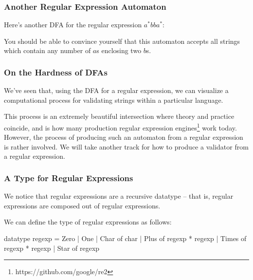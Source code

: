 \documentclass[aspectratio=169, handout]{beamer}
\begin{document}
\begin{frame}[fragile]
  \frametitle{Another Regular Expression Automaton}

  Here's another DFA for the regular expression $a^*bba^*$:

  \vspace{\fill}


  \pause
  \vspace{\fill}

  You should be able to convince yourself that this automaton accepts
  all strings which contain any number of $a$s enclosing two $b$s.
\end{frame}



\begin{frame}[fragile]
  \frametitle{On the Hardness of DFAs}

  We've seen that, using the DFA for a regular expression, we can
  visualize a computational process for validating strings within a
  particular language.

  \pause
  \vspace{\fill}

  This process is an extremely beautiful intersection where theory and
  practice coincide, and is how many production regular expression engines\footnote{
    https://github.com/google/re2
  }
  work today. However, the process of producing such an automaton from
  a regular expression is rather involved. We will take another track
  for how to produce a validator from a regular expression.
\end{frame}

\begin{frame}[fragile]
  \frametitle{A Type for Regular Expressions}

  \tgs

  We notice that regular expressions are a recursive datatype -- that is,
  regular expressions are composed out of regular expressions.

  \vspace{\fill}

  We can define the type of regular expressions as follows:

  \begin{codeblock}
    datatype regexp =
        Zero
      | One
      | Char of char
      | Plus of regexp * regexp
      | Times of regexp * regexp
      | Star of regexp
  \end{codeblock}
\end{frame}
\end{document}
